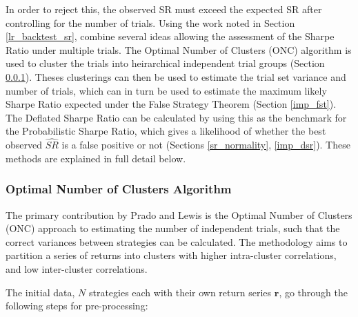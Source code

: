 \documentclass[a4paper,11pt,oneside]{article}
\theoremstyle{plain}
\theoremstyle{definition}
\begin{document}
	In order to reject this, the observed SR must exceed the expected SR after controlling for the number of trials. Using the 
	work noted in Section \ref{lr_backtest_sr}, \citet{PradoDSR} combine several ideas allowing the assessment of the Sharpe Ratio under multiple trials. The Optimal Number of Clusters (ONC) algorithm is used to cluster the trials into heirarchical independent trial groups (Section \ref{imp_onc}). Theses clusterings can then be used to estimate the trial set variance and number of trials, which can in turn be used to estimate the maximum likely Sharpe Ratio expected under the False Strategy Theorem (Section  \ref{imp_fst}). The Deflated Sharpe Ratio can be calculated by using this as the benchmark for the Probabilistic Sharpe Ratio, which gives a likelihood of whether the best observed $\widehat{SR}$ is a false positive or not (Sections \ref{sr_normality}, \ref{imp_dsr}). These methods are explained in full detail below.
	
	\subsubsection{Optimal Number of Clusters Algorithm}\label{imp_onc}
	
	The primary contribution by Prado and Lewis is the Optimal Number of Clusters (ONC) approach to estimating the number of independent trials, such that the correct variances between strategies can be calculated. The methodology aims to partition a series of returns into clusters with higher intra-cluster correlations, and low inter-cluster correlations. \newline
	
	The initial data, $N$ strategies each with their own return series $\mathbf{r}$, go through the following steps for pre-processing:
		
\end{document}
